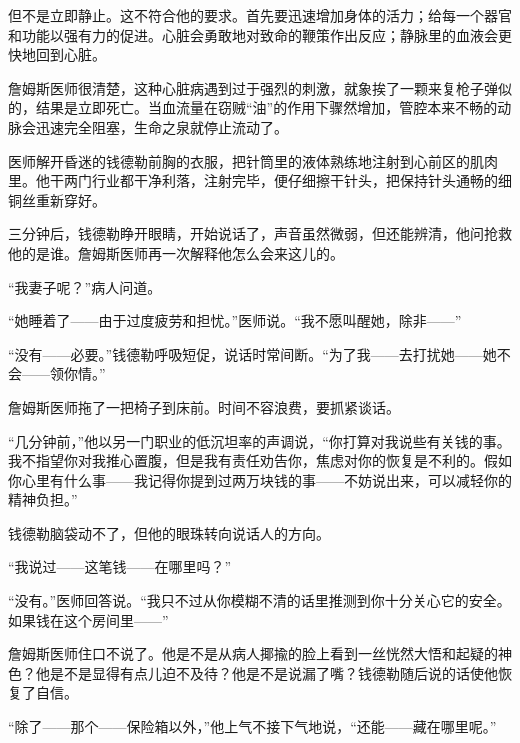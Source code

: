 \documentclass{article}
\begin{document}
但不是立即静止。这不符合他的要求。首先要迅速增加身体的活力；给每一个器官和功能以强有力的促进。心脏会勇敢地对致命的鞭策作出反应；静脉里的血液会更快地回到心脏。



詹姆斯医师很清楚，这种心脏病遇到过于强烈的刺激，就象挨了一颗来复枪子弹似的，结果是立即死亡。当血流量在窃贼“油”的作用下骤然增加，管腔本来不畅的动脉会迅速完全阻塞，生命之泉就停止流动了。



医师解开昏迷的钱德勒前胸的衣服，把针筒里的液体熟练地注射到心前区的肌肉里。他干两门行业都干净利落，注射完毕，便仔细擦干针头，把保持针头通畅的细铜丝重新穿好。



三分钟后，钱德勒睁开眼睛，开始说话了，声音虽然微弱，但还能辨清，他问抢救他的是谁。詹姆斯医师再一次解释他怎么会来这儿的。



“我妻子呢？”病人问道。



“她睡着了——由于过度疲劳和担忧。”医师说。“我不愿叫醒她，除非——”



“没有——必要。”钱德勒呼吸短促，说话时常间断。“为了我——去打扰她——她不会——领你情。”



詹姆斯医师拖了一把椅子到床前。时间不容浪费，要抓紧谈话。



“几分钟前，”他以另一门职业的低沉坦率的声调说，“你打算对我说些有关钱的事。我不指望你对我推心置腹，但是我有责任劝告你，焦虑对你的恢复是不利的。假如你心里有什么事——我记得你提到过两万块钱的事——不妨说出来，可以减轻你的精神负担。”



钱德勒脑袋动不了，但他的眼珠转向说话人的方向。



“我说过——这笔钱——在哪里吗？”



“没有。”医师回答说。“我只不过从你模糊不清的话里推测到你十分关心它的安全。如果钱在这个房间里——”



詹姆斯医师住口不说了。他是不是从病人揶揄的脸上看到一丝恍然大悟和起疑的神色？他是不是显得有点儿迫不及待？他是不是说漏了嘴？钱德勒随后说的话使他恢复了自信。



“除了——那个——保险箱以外，”他上气不接下气地说，“还能——藏在哪里呢。”
\end{document}
